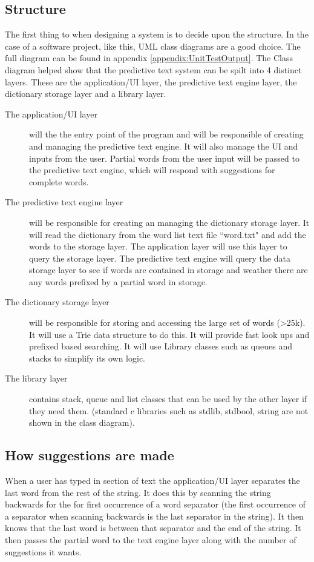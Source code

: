 \documentclass[10pt]{article} %
\begin{document}
        \subsection{Structure}
            The first thing to when designing a system is to decide upon the structure. In the case of a software project, like this, UML class diagrams are a good choice. The full diagram can be found in appendix \ref{appendix:UnitTestOutput}. The Class diagram helped show that the predictive text system can be spilt into 4 distinct layers. These are the application/UI layer, the predictive text engine layer, the dictionary storage layer and a library layer.
            \begin{description}
            \item[The application/UI layer] will the the entry point of the program and will be responsible of creating and managing the predictive text engine. It will also manage the UI and inputs from the user.
            Partial words from the user input will be passed to the predictive text engine, which will respond with suggestions for complete words.
            
            \item[The predictive text engine layer] will be responsible for creating an managing the dictionary storage layer. It will read the dictionary from the word list text file ``word.txt" and add the words to the storage layer. The application layer will use this layer to query the storage layer. The predictive text engine will query the data storage layer to see if words are contained in storage and weather there are any words prefixed by a partial word in storage.
            
            \item[The dictionary storage layer] will be responsible for storing and accessing the large set of words (\textgreater 25k). It will use a Trie data structure to do this. It will provide fast look ups and prefixed based searching. It will use Library classes such as queues and stacks to simplify its own logic.
            
            \item[The library layer] contains stack, queue and list classes that can be used by the other layer if they need them. (standard c libraries such as stdlib, stdbool, string are not shown in the class diagram).
            \end{description}
        \subsection{How suggestions are made}
            When a user has typed in section of text the application/UI layer separates the last word from the rest of the string. It does this by scanning the string backwards for the for first occurrence of a word separator (the first occurrence of a separator when scanning backwards is the last separator in the string). It then knows that the last word is between that separator and the end of the string. It then passes the partial word to the text engine layer along with the number of suggestions it wants.
            
\end{document}
